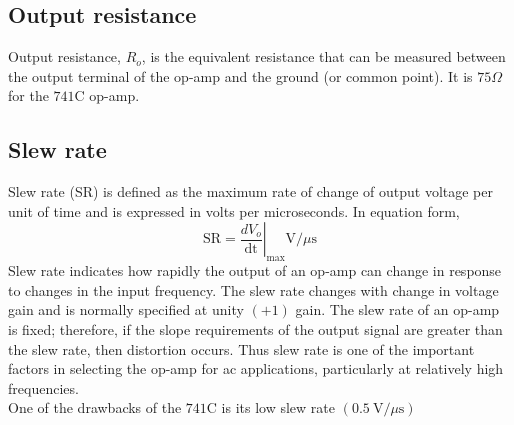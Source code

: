    \subsection{Output resistance}
   Output resistance, $R_{o}$, is the equivalent resistance that can be measured between the output terminal of the op-amp and the ground (or common point). It is $75 \Omega$ for the $741 \mathrm{C}$ op-amp.
   \subsection{Slew rate}
   Slew rate (SR) is defined as the maximum rate of change of output voltage per unit of time and is expressed in volts per microseconds. In equation form,
   $$
   \mathrm{SR}=\left.\frac{d V_{o}}{\mathrm{dt}}\right|_\mathrm{max} \mathrm{V} / \mu \mathrm{s}
   $$
   Slew rate indicates how rapidly the output of an op-amp can change in response to changes in the input frequency. The slew rate changes with change in voltage gain and is normally specified at unity $(+1)$ gain. The slew rate of an op-amp is fixed; therefore, if the slope requirements of the output signal are greater than the slew rate, then distortion occurs. Thus slew rate is one of the important factors in selecting the op-amp for ac applications, particularly at relatively high frequencies.\\
    One of the drawbacks of the $ 741 \mathrm{C}$ is its low slew rate $(0.5 \mathrm{~V} / \mu \mathrm{s})$ 
